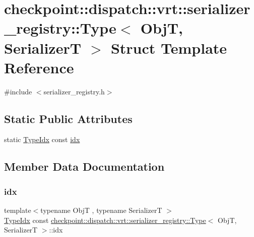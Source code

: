 \hypertarget{structcheckpoint_1_1dispatch_1_1vrt_1_1serializer__registry_1_1_type}{}\section{checkpoint\+:\+:dispatch\+:\+:vrt\+:\+:serializer\+\_\+registry\+:\+:Type$<$ ObjT, SerializerT $>$ Struct Template Reference}
\label{structcheckpoint_1_1dispatch_1_1vrt_1_1serializer__registry_1_1_type}


{\ttfamily \#include $<$serializer\+\_\+registry.\+h$>$}

\subsection*{Static Public Attributes}
\begin{DoxyCompactItemize}
\item 
static \hyperlink{namespacecheckpoint_1_1dispatch_1_1vrt_acd3f9e6b091bcfbc23dc35ea8ef45d3b}{Type\+Idx} const \hyperlink{structcheckpoint_1_1dispatch_1_1vrt_1_1serializer__registry_1_1_type_aa963c63003929aba7744878d9973f114}{idx}
\end{DoxyCompactItemize}


\subsection{Member Data Documentation}
\mbox{\label{structcheckpoint_1_1dispatch_1_1vrt_1_1serializer__registry_1_1_type_aa963c63003929aba7744878d9973f114}} 
\subsubsection{\texorpdfstring{idx}{idx}}
{\footnotesize\ttfamily template$<$typename ObjT , typename SerializerT $>$ \\
\hyperlink{namespacecheckpoint_1_1dispatch_1_1vrt_acd3f9e6b091bcfbc23dc35ea8ef45d3b}{Type\+Idx} const \hyperlink{structcheckpoint_1_1dispatch_1_1vrt_1_1serializer__registry_1_1_type}{checkpoint\+::dispatch\+::vrt\+::serializer\+\_\+registry\+::\+Type}$<$ ObjT, SerializerT $>$\+::idx\hspace{0.3cm}{\ttfamily [static]}}


